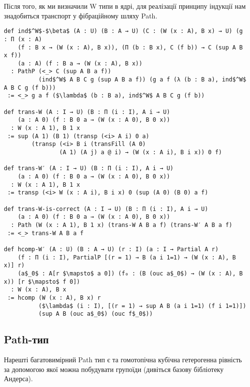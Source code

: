 \newpage
Після того, як ми визначили W типи в ядрі, для реалізації
принципу індукції нам знадобиться транспорт у фібраційному шляху Path.

\begin{lstlisting}[mathescape=true]
def ind$^W$-$\beta$ (A : U) (B : A → U) (C : (W (x : A), B x) → U) (g : Π (x : A)
    (f : B x → (W (x : A), B x)), (Π (b : B x), C (f b)) → C (sup A B x f))
    (a : A) (f : B a → (W (x : A), B x))
  : PathP (<_> C (sup A B a f))
          (ind$^W$ A B C g (sup A B a f)) (g a f (λ (b : B a), ind$^W$ A B C g (f b)))
 := <_> g a f ($\lambda$ (b : B a), ind$^W$ A B C g (f b))

def trans-W (A : I → U) (B : Π (i : I), A i → U)
    (a : A 0) (f : B 0 a → (W (x : A 0), B 0 x))
  : W (x : A 1), B 1 x
 := sup (A 1) (B 1) (transp (<i> A i) 0 a)
        (transp (<i> B i (transFill (A 0)
                (A 1) (A j) a @ i) → (W (x : A i), B i x)) 0 f)

def trans-W′ (A : I → U) (B : Π (i : I), A i → U)
    (a : A 0) (f : B 0 a → (W (x : A 0), B 0 x))
  : W (x : A 1), B 1 x
 := transp (<i> W (x : A i), B i x) 0 (sup (A 0) (B 0) a f)

def trans-W-is-correct (A : I → U) (B : Π (i : I), A i → U)
    (a : A 0) (f : B 0 a → (W (x : A 0), B 0 x))
  : Path (W (x : A 1), B 1 x) (trans-W A B a f) (trans-W′ A B a f)
 := <_> trans-W A B a f

def hcomp-W′ (A : U) (B : A → U) (r : I) (a : I → Partial A r)
    (f : Π (i : I), PartialP [(r = 1) → B (a i 1=1) → (W (x : A), B x)] r)
    (a$_0$ : A[r $\mapsto$ a 0]) (f₀ : (B (ouc a$_0$) → (W (x : A), B x)) [r $\mapsto$ f 0])
  : W (x : A), B x
 := hcomp (W (x : A), B x) r
          ($\lambda$ (i : I), [(r = 1) → sup A B (a i 1=1) (f i 1=1)])
          (sup A B (ouc a$_0$) (ouc f$_0$))
\end{lstlisting}

\newpage
\subsection*{Path-тип}
Нарешті багатовимірний Path тип є та гомотопічна кубічна гетерогенна
рівність за допомогою якої можна побудувати групоїди (дивіться базову бібліотеку Андерса).

